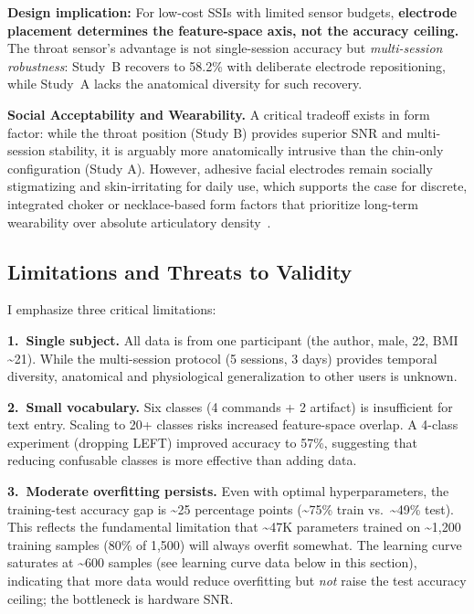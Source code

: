 \documentclass{article}
\begin{document}
\textbf{Design implication:} For low-cost SSIs with limited sensor budgets, \textbf{electrode placement determines the feature-space axis, not the accuracy ceiling.} The throat sensor's advantage is not single-session accuracy but \emph{multi-session robustness}: Study~B recovers to 58.2\% with deliberate electrode repositioning, while Study~A lacks the anatomical diversity for such recovery.

\textbf{Social Acceptability and Wearability.} A critical tradeoff exists in form factor: while the throat position (Study B) provides superior SNR and multi-session stability, it is arguably more anatomically intrusive than the chin-only configuration (Study A). However, adhesive facial electrodes remain socially stigmatizing and skin-irritating for daily use, which supports the case for discrete, integrated choker or necklace-based form factors that prioritize long-term wearability over absolute articulatory density~\cite{kapur2018}.

\subsection{Limitations and Threats to Validity}
\label{sec:limitations}

I emphasize three critical limitations:

\textbf{1.\ Single subject.} All data is from one participant (the author, male, 22, BMI \textasciitilde21). While the multi-session protocol (5 sessions, 3 days) provides temporal diversity, anatomical and physiological generalization to other users is unknown.

\textbf{2.\ Small vocabulary.} Six classes (4 commands + 2 artifact) is insufficient for text entry. Scaling to 20+ classes risks increased feature-space overlap. A 4-class experiment (dropping LEFT) improved accuracy to 57\%, suggesting that reducing confusable classes is more effective than adding data.

\textbf{3.\ Moderate overfitting persists.} Even with optimal hyperparameters, the training-test accuracy gap is \textasciitilde25 percentage points (\textasciitilde75\% train vs.\ \textasciitilde49\% test). This reflects the fundamental limitation that \textasciitilde47K parameters trained on \textasciitilde1,200 training samples (80\% of 1,500) will always overfit somewhat. The learning curve saturates at \textasciitilde600 samples (see learning curve data below in this section), indicating that more data would reduce overfitting but \emph{not} raise the test accuracy ceiling; the bottleneck is hardware SNR.
\end{document}
